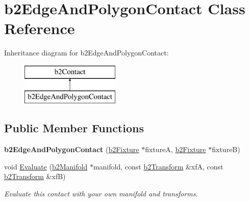 \hypertarget{classb2_edge_and_polygon_contact}{\section{b2\-Edge\-And\-Polygon\-Contact Class Reference}
\label{classb2_edge_and_polygon_contact}
}
Inheritance diagram for b2\-Edge\-And\-Polygon\-Contact\-:\begin{figure}[H]
\begin{center}
\leavevmode
\includegraphics[height=2.000000cm]{classb2_edge_and_polygon_contact}
\end{center}
\end{figure}
\subsection*{Public Member Functions}
\begin{DoxyCompactItemize}
\item 
\hypertarget{classb2_edge_and_polygon_contact_a79d9b012c4a0df7d5c3dcecd33df7d5f}{{\bfseries b2\-Edge\-And\-Polygon\-Contact} (\hyperlink{classb2_fixture}{b2\-Fixture} $\ast$fixture\-A, \hyperlink{classb2_fixture}{b2\-Fixture} $\ast$fixture\-B)}\label{classb2_edge_and_polygon_contact_a79d9b012c4a0df7d5c3dcecd33df7d5f}

\item 
\hypertarget{classb2_edge_and_polygon_contact_a5f360f5f0b1d367beb517ba9f380c84b}{void \hyperlink{classb2_edge_and_polygon_contact_a5f360f5f0b1d367beb517ba9f380c84b}{Evaluate} (\hyperlink{structb2_manifold}{b2\-Manifold} $\ast$manifold, const \hyperlink{structb2_transform}{b2\-Transform} \&xf\-A, const \hyperlink{structb2_transform}{b2\-Transform} \&xf\-B)}\label{classb2_edge_and_polygon_contact_a5f360f5f0b1d367beb517ba9f380c84b}

\begin{DoxyCompactList}\small\item\em Evaluate this contact with your own manifold and transforms. \end{DoxyCompactList}\end{DoxyCompactItemize}
